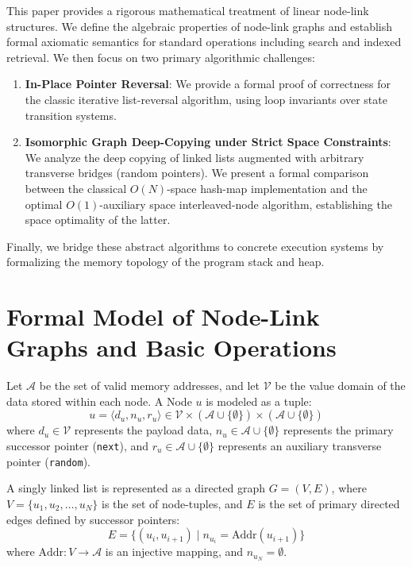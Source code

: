 \documentclass[10pt,journal,compsoc]{IEEEtran}
\begin{document}
This paper provides a rigorous mathematical treatment of linear node-link structures. We define the algebraic properties of node-link graphs and establish formal axiomatic semantics for standard operations including search and indexed retrieval. We then focus on two primary algorithmic challenges:
\begin{enumerate}
\item \textbf{In-Place Pointer Reversal}: We provide a formal proof of correctness for the classic iterative list-reversal algorithm, using loop invariants over state transition systems.
\item \textbf{Isomorphic Graph Deep-Copying under Strict Space Constraints}: We analyze the deep copying of linked lists augmented with arbitrary transverse bridges (random pointers). We present a formal comparison between the classical $O(N)$-space hash-map implementation and the optimal $O(1)$-auxiliary space interleaved-node algorithm, establishing the space optimality of the latter.
\end{enumerate}
Finally, we bridge these abstract algorithms to concrete execution systems by formalizing the memory topology of the program stack and heap.

\section{Formal Model of Node-Link Graphs and Basic Operations}
Let $\mathcal{A}$ be the set of valid memory addresses, and let $\mathcal{V}$ be the value domain of the data stored within each node. A Node $u$ is modeled as a tuple:
\[ u = \langle d_u, n_u, r_u \rangle \in \mathcal{V} \times (\mathcal{A} \cup \{\emptyset\}) \times (\mathcal{A} \cup \{\emptyset\}) \]
where $d_u \in \mathcal{V}$ represents the payload data, $n_u \in \mathcal{A} \cup \{\emptyset\}$ represents the primary successor pointer (\texttt{next}), and $r_u \in \mathcal{A} \cup \{\emptyset\}$ represents an auxiliary transverse pointer (\texttt{random}).

A singly linked list is represented as a directed graph $G = (V, E)$, where $V = \{u_1, u_2, \dots, u_N\}$ is the set of node-tuples, and $E$ is the set of primary directed edges defined by successor pointers:
\[ E = \{ (u_i, u_{i+1}) \mid n_{u_i} = \text{Addr}(u_{i+1}) \} \]
where $\text{Addr}: V \to \mathcal{A}$ is an injective mapping, and $n_{u_N} = \emptyset$.
\end{document}
